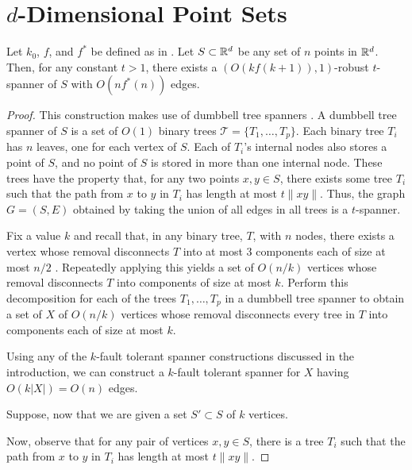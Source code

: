 \documentclass{patmorin}
\begin{document}
\section{$d$-Dimensional Point Sets}

\begin{thm}
Let $k_0$, $f$, and $f^*$ be defined as in .
Let $S\subset \mathbb{R}^d$ be any set of $n$ points in $\mathbb{R}^d$.  Then, for any
constant $t>1$,  there exists a $(O(kf(k+1)),1)$-robust $t$-spanner of $S$
with $O(nf^*(n))$ edges.
\end{thm}

\begin{proof} 
This construction makes use of dumbbell tree spanners \cite{X}.
A dumbbell tree spanner of $S$ is a set of $O(1)$ binary trees
$\mathcal{T}=\{T_1,\ldots,T_p\}$.  Each binary tree $T_i$ has $n$ leaves,
one for each vertex of $S$.  Each of $T_i$'s internal nodes also stores
a point of $S$, and no point of $S$ is stored in more than one internal
node.  These trees have the property that, for any two points $x,y\in S$,
there exists some tree $T_i$ such that the path from $x$ to $y$ in $T_i$
has length at most $t\|xy\|$.  Thus, the graph $G=(S,E)$ obtained by
taking the union of all edges in all trees is a $t$-spanner.

Fix a value $k$ and recall that, in any binary tree, $T$, with $n$ nodes,
there exists a vertex whose removal disconnects $T$ into at most 3
components each of size at most $n/2$ \cite{S}.  Repeatedly applying this
yields a set of $O(n/k)$ vertices whose removal disconnects $T$ into
components of size at most $k$.  Perform this decomposition for each of
the trees $T_1,\ldots,T_p$ in a dumbbell tree spanner to obtain a set
of $X$ of $O(n/k)$ vertices whose removal disconnects every tree in $T$
into components each of size at most $k$.

Using any of the $k$-fault tolerant spanner constructions discussed in
the introduction, we can construct a $k$-fault tolerant spanner for $X$
having $O(k|X|)=O(n)$ edges. 

Suppose, now that we are given a set $S'\subset S$ of $k$ vertices.

  Now, observe that for any pair of vertices
$x,y\in S$, there is a tree $T_i$ such that the path from $x$ to $y$ in $T_i$ has length at most $t\|xy\|$.



\end{proof}
\end{document}
